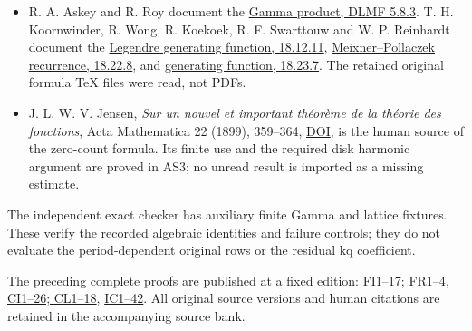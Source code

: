\documentclass[11pt]{article}
\begin{document}
\begin{itemize}
  \href{https://github.com/KokunoYumeto/zeta-function-research-reader/blob/7230c00b9f07dd222b2aea95427d67918f3a8cac/workbenches/splitzero-tandem/continuations/20260921-local-covariance-activation/009/CONDUCTOR_DIVISOR_COVARIANCE_RETURN.tex\#L139}{DCR1--27} and \href{https://github.com/KokunoYumeto/zeta-function-research-reader/blob/7230c00b9f07dd222b2aea95427d67918f3a8cac/workbenches/splitzero-tandem/continuations/20260921-local-covariance-activation/010/ORIGINAL_ADJACENT_CUTOFF_CURRENT.tex}{ACC17--23} are the full arithmetic receiver. \href{https://github.com/KokunoYumeto/zeta-function-research-reader/blob/5992ad50c0f2a06921f1fcaded7b4e38097c0739/workbenches/splitzero-tandem/continuations/20260920-original-kernel-mixed-determinants/providers/09_INPUT_CUMULATIVE_PROOFS.tex\#L23179}{OOQ1--40} is the exact original outer-profile source; this note makes no new claim of reading the whole cumulative corpus.
\item
  R. A. Askey and R. Roy document the \href{https://dlmf.nist.gov/5.8.E3}{Gamma product, DLMF 5.8.3}. T. H. Koornwinder, R. Wong, R. Koekoek, R. F. Swarttouw and W. P. Reinhardt document the \href{https://dlmf.nist.gov/18.12.E11}{Legendre generating function, 18.12.11}, \href{https://dlmf.nist.gov/18.22.E8}{Meixner--Pollaczek recurrence, 18.22.8}, and \href{https://dlmf.nist.gov/18.23.E7}{generating function, 18.23.7}. The retained original formula TeX files were read, not PDFs.
\item
  J. L. W. V. Jensen, \emph{Sur un nouvel et important théorème de la théorie des fonctions}, Acta Mathematica 22 (1899), 359--364, \href{https://doi.org/10.1007/BF02417878}{DOI}, is the human source of the zero-count formula. Its finite use and the required disk harmonic argument are proved in AS3; no unread result is imported as a missing estimate.
\end{itemize}

The independent exact checker has auxiliary finite Gamma and lattice fixtures. These verify the recorded algebraic identities and failure controls; they do not evaluate the period-dependent original rows or the residual kq coefficient.

The preceding complete proofs are published at a fixed edition: \href{https://github.com/KokunoYumeto/zeta-function-research-reader/blob/75256b0237884bdef0074c2ac6310de1ea32ec26/workbenches/splitzero-tandem/continuations/20260921-invariant-collision/FINITE_INVARIANT_PROOFS.md}{FI1--17; FR1--4}, \href{https://github.com/KokunoYumeto/zeta-function-research-reader/blob/75256b0237884bdef0074c2ac6310de1ea32ec26/workbenches/splitzero-tandem/continuations/20260921-invariant-collision/CUTOFF_INNOVATION_PROOFS.md}{CI1--26; CL1--18}, \href{https://github.com/KokunoYumeto/zeta-function-research-reader/blob/75256b0237884bdef0074c2ac6310de1ea32ec26/workbenches/splitzero-tandem/continuations/20260921-invariant-collision/COLLISION_PROOFS.md}{IC1--42}. All original source versions and human citations are retained in the accompanying source bank.
\end{document}
